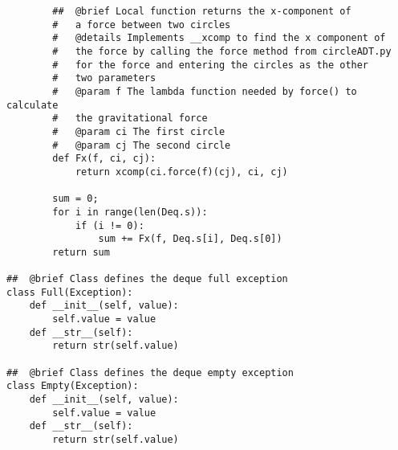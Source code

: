 \documentclass{article}
\begin{document}
\begin{lstlisting}
        ##  @brief Local function returns the x-component of 
        #   a force between two circles
        #   @details Implements __xcomp to find the x component of 
        #   the force by calling the force method from circleADT.py 
        #   for the force and entering the circles as the other 
        #   two parameters
        #   @param f The lambda function needed by force() to calculate 
        #   the gravitational force
        #   @param ci The first circle 
        #   @param cj The second circle
        def Fx(f, ci, cj):
            return xcomp(ci.force(f)(cj), ci, cj)
        
        sum = 0;
        for i in range(len(Deq.s)):
            if (i != 0):
                sum += Fx(f, Deq.s[i], Deq.s[0])
        return sum

##  @brief Class defines the deque full exception
class Full(Exception):
    def __init__(self, value):
        self.value = value
    def __str__(self):
        return str(self.value)

##  @brief Class defines the deque empty exception
class Empty(Exception):
    def __init__(self, value):
        self.value = value
    def __str__(self):
        return str(self.value)

\end{lstlisting}
\end{document}
